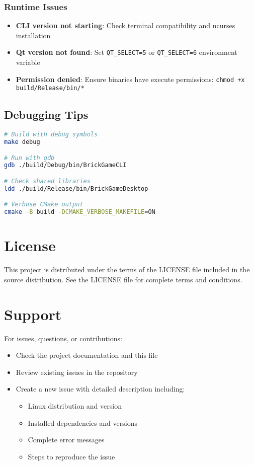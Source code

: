 \documentclass[12pt]{article}
\begin{document}
\subsubsection{Runtime Issues}
\begin{itemize}
\item \textbf{CLI version not starting}: Check terminal compatibility and ncurses installation
\item \textbf{Qt version not found}: Set \texttt{QT\_SELECT=5} or \texttt{QT\_SELECT=6} environment variable
\item \textbf{Permission denied}: Ensure binaries have execute permissions: \verb|chmod +x build/Release/bin/*|
\end{itemize}

\subsection{Debugging Tips}
\begin{lstlisting}[language=bash]
# Build with debug symbols
make debug

# Run with gdb
gdb ./build/Debug/bin/BrickGameCLI

# Check shared libraries
ldd ./build/Release/bin/BrickGameDesktop

# Verbose CMake output
cmake -B build -DCMAKE_VERBOSE_MAKEFILE=ON
\end{lstlisting}

\section{License}
This project is distributed under the terms of the LICENSE file included in the source distribution. See the LICENSE file for complete terms and conditions.

\section{Support}
For issues, questions, or contributions:
\begin{itemize}
    \item Check the project documentation and this file
    \item Review existing issues in the repository
    \item Create a new issue with detailed description including:
    \begin{itemize}
        \item Linux distribution and version
        \item Installed dependencies and versions
        \item Complete error messages
        \item Steps to reproduce the issue
    \end{itemize}
\end{itemize}
\end{document}
